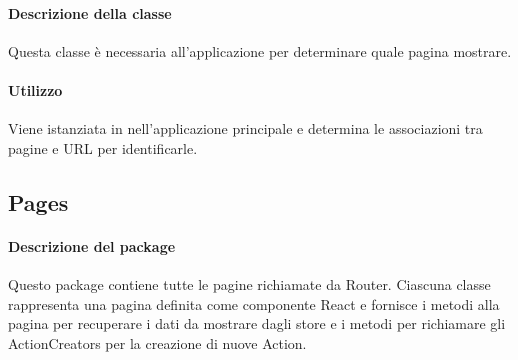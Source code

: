 \paragraph*{Descrizione della classe}
Questa classe è necessaria all'applicazione per determinare quale pagina mostrare.
\paragraph*{Utilizzo}
Viene istanziata in nell'applicazione principale e determina le associazioni tra pagine e URL per identificarle.

\subsection{Pages}
\paragraph*{Descrizione del package}
Questo package contiene tutte le pagine richiamate da Router. Ciascuna classe rappresenta una pagina definita come componente React e fornisce i metodi alla pagina per recuperare i dati da mostrare dagli store e i metodi per richiamare gli ActionCreators per la creazione di nuove Action.

